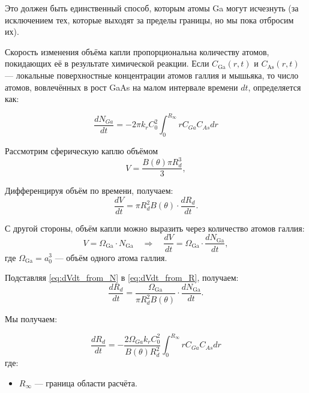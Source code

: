 \documentclass[14pt,oneside]{extarticle}
\begin{document}
Это должен быть единственный способ, которым атомы Ga могут исчезнуть (за исключением тех, которые выходят за пределы границы, но мы пока отбросим их). 

Скорость изменения объёма капли пропорциональна количеству атомов, покидающих её в результате химической реакции. Если \( C_{\text{Ga}}(r,t) \) и \( C_{\text{As}}(r,t) \) — локальные поверхностные концентрации атомов галлия и мышьяка, то число атомов, вовлечённых в рост GaAs на малом интервале времени \( dt \), определяется как:

\begin{equation}
\frac{dN_{Ga}}{dt}=-2\pi k_{r}C_{0}^{2}\int_{0}^{R_{\infty}}rC_{Ga}C_{As}dr
\end{equation}

Рассмотрим сферическую каплю объёмом
\begin{equation}
V = \frac{B(\theta)\pi R_d^3}{3},
\end{equation}

Дифференцируя объём по времени, получаем:
\begin{equation}
\frac{dV}{dt} = {\pi R_d^2B(\theta)} \cdot \frac{dR_d}{dt}.
\label{eq:dVdt_from_R}
\end{equation}

С другой стороны, объём капли можно выразить через количество атомов галлия:
\begin{equation}
V = \Omega_{\text{Ga}} \cdot N_{\text{Ga}} \quad \Rightarrow \quad \frac{dV}{dt} = \Omega_{\text{Ga}} \cdot \frac{dN_{\text{Ga}}}{dt},
\label{eq:dVdt_from_N}
\end{equation}
где $\Omega_{\text{Ga}} = a_0^3$ — объём одного атома галлия.

Подставляя \eqref{eq:dVdt_from_N} в \eqref{eq:dVdt_from_R}, получаем:
\begin{equation}
\frac{dR_d}{dt} = \frac{\Omega_{\text{Ga}} }{\pi R_d^2 B(\theta)} \cdot \frac{dN_{\text{Ga}}}{dt}.
\end{equation}

Мы получаем:

\begin{equation}
\frac{dR_{d}}{dt}=-\frac{2\Omega_{Ga}k_{r}C_{0}^{2}}{B\left(\theta\right)R_{d}^{2}}\int_{0}^{R_{\infty}}rC_{Ga}C_{As}dr
\label{eq:dRdt_integral}
\end{equation}
где:
\begin{itemize}
  \item \( R_\infty \) — граница области расчёта.
\end{itemize}
\end{document}
